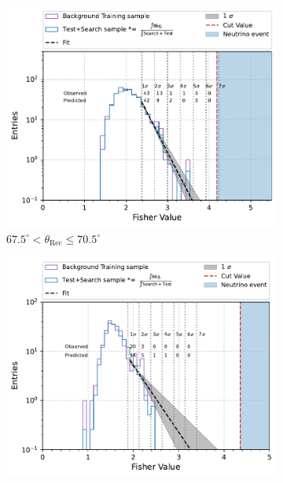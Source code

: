 \begin{figure}[h!]
    \begin{subfigure}[r]{.48\textwidth}
      \centering
      \includegraphics[width=\linewidth]{thesis_figures/Nu_analysis/Fisher_plots/Fisher_fit_search+test_bkg_region_67.5_70.5.pdf}
      \caption{$ 67.5^{\circ} <\theta_{\text{Rec}} \leq 70.5^{\circ}$}
    \end{subfigure}
    \hfill    
    \begin{subfigure}[r]{.48\textwidth}
      \centering
      \includegraphics[width=\linewidth]{thesis_figures/Nu_analysis/Fisher_plots/Fisher_fit_search+test_bkg_region_70.5_73.5.pdf}

\end{subfigure}
\end{figure}

